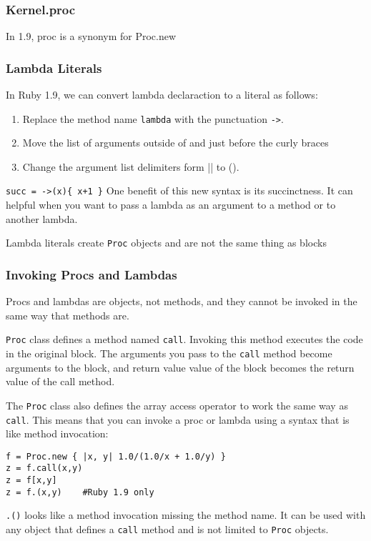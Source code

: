 \documentclass[11pt, a4paper]{book}
\begin{document}
\subsubsection{Kernel.proc}
In 1.9, proc is a synonym for Proc.new

\subsubsection{Lambda Literals}
In Ruby 1.9, we can convert lambda declaraction to a literal as follows:
\begin{enumerate}
\item Replace the method name \verb|lambda| with the punctuation \verb|->|.
\item Move the list of arguments outside of and just before the curly braces
\item Change the argument list delimiters form || to ().
\end{enumerate}
\verb|succ = ->(x){ x+1 }|
One benefit of this new syntax is its succinctness. It can helpful when you want
to pass a lambda as an argument to a method or to another lambda.

Lambda literals create \verb|Proc| objects and are not the same thing as blocks

\subsubsection{Invoking Procs and Lambdas}
Procs and lambdas are objects, not methods, and they cannot be invoked in the
same way that methods are.

\verb|Proc| class defines a method named \verb|call|. Invoking this method
executes the code in the original block. The arguments you pass to the
\verb|call| method become arguments to the block, and return value value of the
block becomes the return value of the call method.

The \verb|Proc| class also defines the array access operator to work the same
way as \verb|call|. This means that you can invoke a proc or lambda using a
syntax that is like method invocation:
\begin{verbatim}
f = Proc.new { |x, y| 1.0/(1.0/x + 1.0/y) }
z = f.call(x,y)
z = f[x,y]
z = f.(x,y)    #Ruby 1.9 only
\end{verbatim}

\verb|.()| looks like a method invocation missing the method name. It can be
used with any object that defines a \verb|call| method and is not limited to
\verb|Proc| objects.
\end{document}
